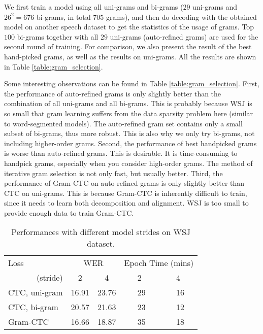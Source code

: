 \documentclass{article}
\begin{document}
We first train a model using all uni-grams and bi-grams ($29$ uni-grams and $26^2=676$ bi-grams, in total $705$ grams), and then do decoding with the obtained model on another speech dataset to get the statistics of the usage of grams. Top $100$ bi-grams together with all $29$ uni-grams (auto-refined grams) are used for the second round of training. For comparison, we also present the result of the best hand-picked grams, as well as the results on uni-grams. All the results are shown in Table \ref{table:gram_selection}.

Some interesting observations can be found in Table \ref{table:gram_selection}. First, the performance of auto-refined grams is only slightly better than the combination of all uni-grams and all bi-grams. This is probably because WSJ is so small that gram learning suffers from the data sparsity problem here (similar to word-segmented models). The auto-refined gram set contains only a small subset of bi-grams, thus more robust. This is also why we only try bi-grams, not including higher-order grams. Second, the performance of best handpicked grams is worse than auto-refined grams. This is desirable. It is time-consuming to handpick grams, especially when you consider high-order grams. The method of iterative gram selection is not only fast, but usually better. Third, the performance of Gram-CTC on auto-refined grams is only slightly better than CTC on uni-grams. 
This is because Gram-CTC is inherently difficult to train, since it needs to learn both decomposition and alignment. WSJ is too small to provide enough data to train Gram-CTC.

\begin{table}[t]
\begin{center}
\begin{tabular}{l| c c | c  c}
\toprule
Loss & \multicolumn{2}{c|}{WER} & \multicolumn{2}{c}{\small{Epoch Time (mins)}}  \\
\multicolumn{1}{r|}{(stride)}    &  2 &  4 &  2 &  4 \\
\midrule
CTC, uni-gram &  16.91 & 23.76 & ~~29~ & ~~16~\\
CTC, bi-gram &  20.57 & 21.63 & ~~23~ & ~~12~ \\
Gram-CTC &  16.66 &  18.87 & ~~35~ & ~~18~\\
\bottomrule
\end{tabular}
\end{center}
\vspace{-10pt}
\caption{Performances with different model strides on WSJ dataset.}
\label{table:stride}
\vspace{-10pt}
\end{table}
\vspace{-8pt}
\end{document}

